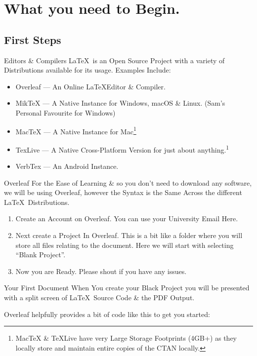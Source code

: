 \documentclass{beamer}
\begin{document}
\section{What you need to Begin.}
\subsection{First Steps}
\begin{frame}{Editors \& Compilers}
\LaTeX~is an Open Source Project with a variety of Distributions available for its usage. Examples Include:\\
\begin{itemize}

\item Overleaf --- An Online \LaTeX Editor \& Compiler.
\item MikTeX --- A Native Instance for Windows, macOS \& Linux. (Sam's Personal Favourite for Windows)
\item MacTeX --- A Native Instance for Mac\footnote{MacTeX \& TeXLive have  very Large Storage Footprints (4GB+) as they locally store and maintain entire copies of the CTAN locally.{\label{fn1}}}
\item TexLive --- A Native Cross-Platform Version for just about anything.\textsuperscript{1}
\item VerbTex --- An Android Instance.

\end{itemize}
\end{frame}

\begin{frame}{Overleaf}
For the Ease of Learning \& so you don't need to download any software, we will be using Overleaf, however the Syntax is the Same Across the different \LaTeX~Distributions.
\begin{enumerate}
\item Create an Account on Overleaf. You can use your University Email Here.
\item Next create a Project In Overleaf. This is a bit like a folder where you will store all files relating to the document. Here we will start with selecting ``Blank Project''.
\item Now you are Ready. Please shout if you have any issues.
\end{enumerate}
\end{frame}


\begin{frame}{Your First Document}
When You create your Black Project you will be presented with a split screen of \LaTeX~Source Code \& the PDF Output.\par Overleaf helpfully provides a bit of code like this to get you started:\\

\end{frame}
\end{document}
